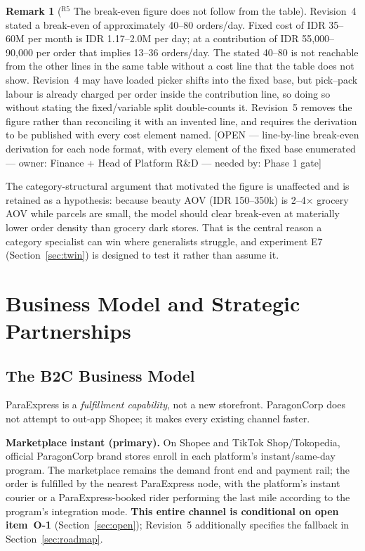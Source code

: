 \documentclass[10pt,twocolumn,letterpaper]{article}
\theoremstyle{definition}
\newtheorem{remark}{Remark}
\newcommand{\OPEN}[3]{{\color{openred}\footnotesize\textsf{[OPEN --- #1 --- owner: #2 --- needed by: #3]}}}
\begin{document}
\begin{remark}[$^{\mathrm{R5}}$ The break-even figure does not follow from the table]
Revision~4 stated a break-even of approximately 40--80 orders/day. Fixed cost of IDR 35--60M per month is IDR 1.17--2.0M per day; at a contribution of IDR 55,000--90,000 per order that implies 13--36 orders/day. The stated 40--80 is not reachable from the other lines in the same table without a cost line that the table does not show. Revision~4 may have loaded picker shifts into the fixed base, but pick--pack labour is already charged per order inside the contribution line, so doing so without stating the fixed/variable split double-counts it. Revision~5 removes the figure rather than reconciling it with an invented line, and requires the derivation to be published with every cost element named. \OPEN{line-by-line break-even derivation for each node format, with every element of the fixed base enumerated}{Finance + Head of Platform R\&D}{Phase 1 gate}

The category-structural argument that motivated the figure is unaffected and is retained as a hypothesis: because beauty AOV (IDR 150--350k) is 2--4$\times$ grocery AOV while parcels are small, the model should clear break-even at materially lower order density than grocery dark stores. That is the central reason a category specialist can win where generalists struggle, and experiment E7 (Section~\ref{sec:twin}) is designed to test it rather than assume it.
\end{remark}

\section{Business Model and Strategic Partnerships}\label{sec:business}

\subsection{The B2C Business Model}
ParaExpress is a \emph{fulfillment capability}, not a new storefront. ParagonCorp does not attempt to out-app Shopee; it makes every existing channel faster.

\textbf{Marketplace instant (primary).} On Shopee and TikTok Shop/Tokopedia, official ParagonCorp brand stores enroll in each platform's instant/same-day program. The marketplace remains the demand front end and payment rail; the order is fulfilled by the nearest ParaExpress node, with the platform's instant courier or a ParaExpress-booked rider performing the last mile according to the program's integration mode. \textbf{This entire channel is conditional on open item~O-1} (Section~\ref{sec:open}); Revision~5 additionally specifies the fallback in Section~\ref{sec:roadmap}.
\end{document}
